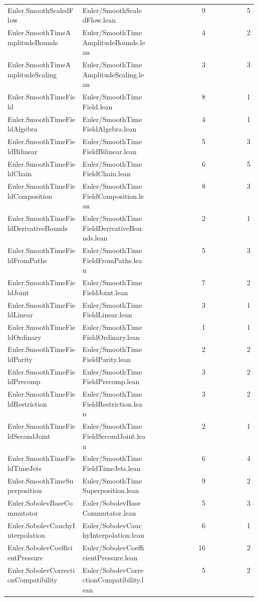 \begin{longtable}{p{0.30\linewidth}p{0.28\linewidth}rr}
Euler.SmoothScaledFlow & Euler/SmoothScaledFlow.lean & 9 & 5\\
Euler.SmoothTimeAmplitudeBounds & Euler/SmoothTimeAmplitudeBounds.lean & 4 & 2\\
Euler.SmoothTimeAmplitudeScaling & Euler/SmoothTimeAmplitudeScaling.lean & 3 & 3\\
Euler.SmoothTimeField & Euler/SmoothTimeField.lean & 8 & 1\\
Euler.SmoothTimeFieldAlgebra & Euler/SmoothTimeFieldAlgebra.lean & 4 & 1\\
Euler.SmoothTimeFieldBilinear & Euler/SmoothTimeFieldBilinear.lean & 5 & 3\\
Euler.SmoothTimeFieldChain & Euler/SmoothTimeFieldChain.lean & 6 & 5\\
Euler.SmoothTimeFieldComposition & Euler/SmoothTimeFieldComposition.lean & 8 & 3\\
Euler.SmoothTimeFieldDerivativeBounds & Euler/SmoothTimeFieldDerivativeBounds.lean & 2 & 1\\
Euler.SmoothTimeFieldFromPaths & Euler/SmoothTimeFieldFromPaths.lean & 5 & 3\\
Euler.SmoothTimeFieldJoint & Euler/SmoothTimeFieldJoint.lean & 7 & 2\\
Euler.SmoothTimeFieldLinear & Euler/SmoothTimeFieldLinear.lean & 3 & 1\\
Euler.SmoothTimeFieldOrdinary & Euler/SmoothTimeFieldOrdinary.lean & 1 & 1\\
Euler.SmoothTimeFieldParity & Euler/SmoothTimeFieldParity.lean & 2 & 2\\
Euler.SmoothTimeFieldPrecomp & Euler/SmoothTimeFieldPrecomp.lean & 3 & 2\\
Euler.SmoothTimeFieldRestriction & Euler/SmoothTimeFieldRestriction.lean & 3 & 2\\
Euler.SmoothTimeFieldSecondJoint & Euler/SmoothTimeFieldSecondJoint.lean & 2 & 1\\
Euler.SmoothTimeFieldTimeJets & Euler/SmoothTimeFieldTimeJets.lean & 6 & 4\\
Euler.SmoothTimeSuperposition & Euler/SmoothTimeSuperposition.lean & 9 & 2\\
Euler.SobolevBaseCommutator & Euler/SobolevBaseCommutator.lean & 5 & 3\\
Euler.SobolevCauchyInterpolation & Euler/SobolevCauchyInterpolation.lean & 6 & 1\\
Euler.SobolevCoefficientPressure & Euler/SobolevCoefficientPressure.lean & 16 & 2\\
Euler.SobolevCorrectionCompatibility & Euler/SobolevCorrectionCompatibility.lean & 5 & 2\\

\end{longtable}
